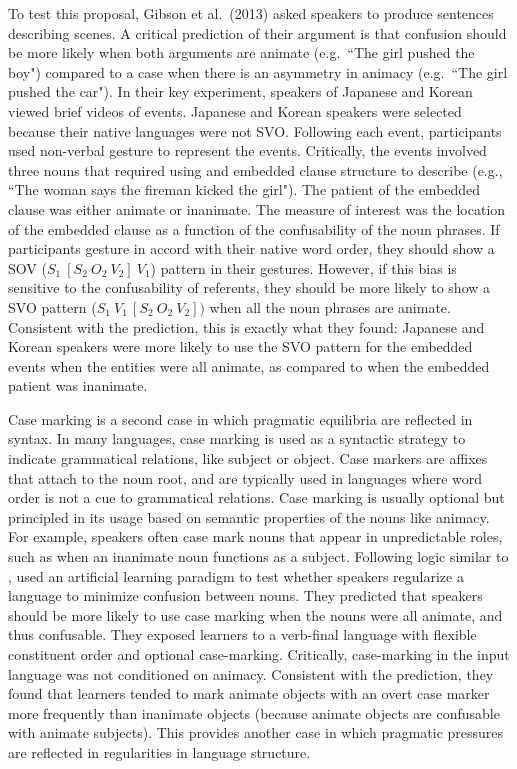 \documentclass[man, noapacite, 12pt]{apa2}
\begin{document}
To test this proposal, Gibson et al.\ (2013) asked speakers to produce sentences describing scenes. A critical prediction of their argument is that confusion should be more likely when both arguments are animate (e.g.\ ``The girl pushed the boy") compared to a case when there is an asymmetry in animacy (e.g.\ ``The girl pushed the car"). In their key experiment, speakers of Japanese and Korean viewed brief videos of events. Japanese and Korean speakers were selected because their native languages were not SVO. Following each event, participants used non-verbal  gesture to represent the events. Critically, the events  involved three nouns that required using and embedded clause structure to describe (e.g., ``The woman says the fireman kicked the girl").  The patient of the embedded clause was either animate or inanimate. The measure of interest was the location of the embedded clause as a function of the confusability of the  noun phrases. If participants gesture in accord with their native word order, they should show a SOV ($S_{1}\  [S_{2}\ O_{2}\ V_{2}]\  V_{1}$) pattern in their gestures. However, if this bias is sensitive to the confusability of  referents, they should be more likely to show a SVO pattern ($S_{1}\  V_{1\ }[S_{2}\ O_{2}\ V_{2}])$ when all the noun phrases are animate. Consistent with the prediction, this is exactly what they found: Japanese and Korean speakers were more likely to use the SVO pattern for the embedded events when the entities were all animate, as compared to when the embedded patient was inanimate.

Case marking is a second case in which pragmatic equilibria are reflected in syntax. In many languages, case marking is used as a syntactic strategy to indicate  grammatical relations, like subject or object. Case markers are affixes that attach to the noun root, and are typically used in languages where word order is not a cue to grammatical relations. Case marking is usually optional but principled in its usage based on semantic properties of the nouns like animacy. For example, speakers often case mark nouns that appear in unpredictable roles, such as when an inanimate noun functions as a subject. Following logic similar to  ,   used an artificial learning paradigm to test whether speakers regularize a language to minimize confusion between nouns. They predicted that speakers should be more likely to use case marking when the nouns were all animate, and thus confusable. They exposed learners to a verb-final language with flexible constituent order and optional case-marking. Critically, case-marking in the input language was not conditioned on animacy. Consistent with the prediction, they found that learners tended to mark animate objects with an overt case marker more frequently than inanimate objects (because animate objects are confusable  with animate subjects). This provides another case in which pragmatic pressures are reflected in  regularities in language structure.
\end{document}
